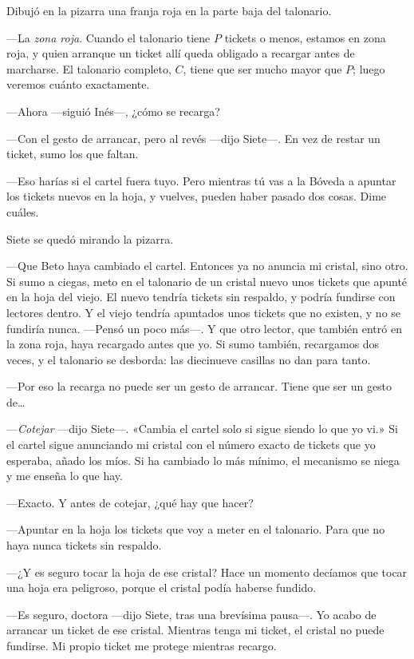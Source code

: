 Dibujó en la pizarra una franja roja en la parte baja del talonario.

---La \emph{zona roja}. Cuando el talonario tiene $P$ tickets o menos, estamos en zona roja, y quien arranque un ticket allí queda obligado a recargar antes de marcharse. El talonario completo, $C$, tiene que ser mucho mayor que $P$; luego veremos cuánto exactamente.

\escena
---Ahora ---siguió Inés---\nobreak, ¿cómo se recarga?

---Con el gesto de arrancar, pero al revés ---dijo Siete---\nobreak. En vez de restar un ticket, sumo los que faltan.

---Eso harías si el cartel fuera tuyo. Pero mientras tú vas a la Bóveda a apuntar los tickets nuevos en la hoja, y vuelves, pueden haber pasado dos cosas. Dime cuáles.

Siete se quedó mirando la pizarra.

---Que Beto haya cambiado el cartel. Entonces ya no anuncia mi cristal, sino otro. Si sumo a ciegas, meto en el talonario de un cristal nuevo unos tickets que apunté en la hoja del viejo. El nuevo tendría tickets sin respaldo, y podría fundirse con lectores dentro. Y el viejo tendría apuntados unos tickets que no existen, y no se fundiría nunca. ---Pensó un poco más---\nobreak. Y que otro lector, que también entró en la zona roja, haya recargado antes que yo. Si sumo también, recargamos dos veces, y el talonario se desborda: las diecinueve casillas no dan para tanto.

---Por eso la recarga no puede ser un gesto de arrancar. Tiene que ser un gesto de\ldots

---\emph{Cotejar} ---dijo Siete---\nobreak. «Cambia el cartel solo si sigue siendo lo que yo vi.» Si el cartel sigue anunciando mi cristal con el número exacto de tickets que yo esperaba, añado los míos. Si ha cambiado lo más mínimo, el mecanismo se niega y me enseña lo que hay.

---Exacto. Y antes de cotejar, ¿qué hay que hacer?

---Apuntar en la hoja los tickets que voy a meter en el talonario. Para que no haya nunca tickets sin respaldo.

---¿Y es seguro tocar la hoja de ese cristal? Hace un momento decíamos que tocar una hoja era peligroso, porque el cristal podía haberse fundido.

---Es seguro, doctora ---dijo Siete, tras una brevísima pausa---\nobreak. Yo acabo de arrancar un ticket de ese cristal. Mientras tenga mi ticket, el cristal no puede fundirse. Mi propio ticket me protege mientras recargo.

